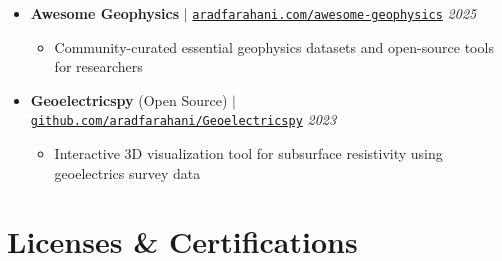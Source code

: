 \documentclass[letterpaper,11pt]{article}
\begin{document}
	\begin{itemize}[left=0pt, label={}, topsep=7.5pt, partopsep=0pt, itemsep=6pt, parsep=0pt]
		\item \textbf{Awesome Geophysics} $|$ \normalfont\href{https://aradfarahani.com/awesome-geophysics/}{\texttt{aradfarahani.com/awesome-geophysics}} \hfill \textit{2025}
		\begin{itemize}[left=15pt, label=\textbullet, topsep=4pt, partopsep=0pt, itemsep=3pt, parsep=0pt]
			\item Community-curated essential geophysics datasets and open-source tools for researchers
		\end{itemize}
	\end{itemize}
	
	\begin{itemize}[left=0pt, label={}, topsep=7.5pt, partopsep=0pt, itemsep=6pt, parsep=0pt]
		\item \textbf{Geoelectricspy} (Open Source) $|$ \normalfont\href{https://github.com/aradfarahani/Geoelectricspy/}{\texttt{github.com/aradfarahani/Geoelectricspy}} \hfill \textit{2023}
		\begin{itemize}[left=15pt, label=\textbullet, topsep=4pt, partopsep=0pt, itemsep=3pt, parsep=0pt]
			\item Interactive 3D visualization tool for subsurface resistivity using geoelectrics survey data
		\end{itemize}
	\end{itemize}
	
	\section{Licenses \& Certifications}
	
\end{document}
